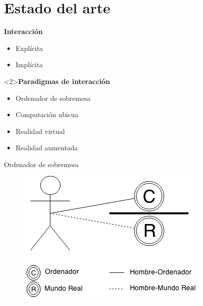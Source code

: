\section{Estado del arte}

\begin{slide}
  \begin{block}{\textbf{Interacción}}
    \begin{itemize}
      \item Explícita
      \item Implícita
    \end{itemize}
  \end{block}
  \begin{block}<2>{\textbf{Paradigmas de interacción}}
    \begin{itemize}
      \item Ordenador de sobremesa
      \item Computación ubicua
      \item Realidad virtual
      \item Realidad aumentada
    \end{itemize}
  \end{block}
\end{slide}

\begin{slide}
  Ordenador de sobremesa
  \begin{figure}[!h]
    \begin{center}
      \includegraphics[height=0.6\textheight]{img/IGU.png}
    \end{center}
  \end{figure}
\end{slide}

